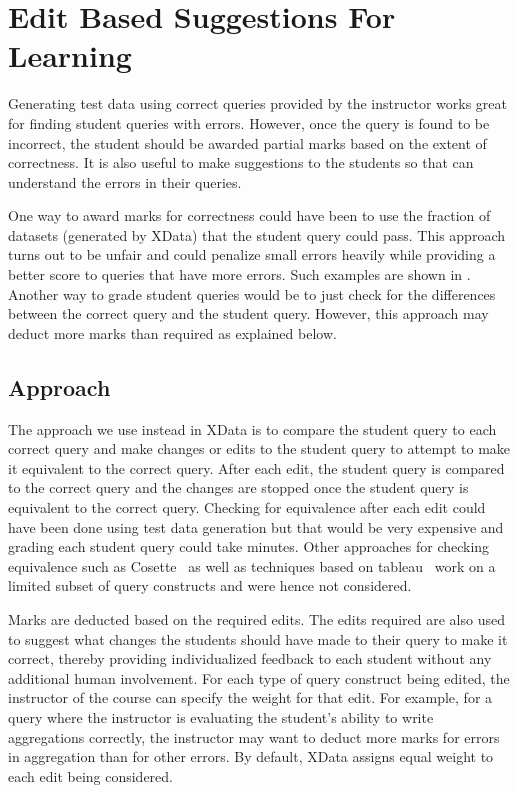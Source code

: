 \section{Edit Based Suggestions For Learning}
\label{sec:edit}
Generating test data using correct queries provided by the instructor works great for finding student queries with errors. However, once the query is found to be incorrect, the student should be awarded partial marks based on the extent of correctness. It is also useful to make suggestions to the students so that can understand the errors in their queries. 

One way to award marks for correctness could have been to use the fraction of datasets (generated by XData) that the student query could pass. This approach turns out to be unfair and could penalize small errors heavily while providing a better score to queries that have more errors. Such examples are shown in \cite{xdata:comad}. Another way to grade student queries would be to just check for the differences between the correct query and the student query. However, this approach may deduct more marks than required as explained below.

\subsection{Approach}


The approach we use instead in XData is to compare the student query to each correct query and make changes or edits to the student query to attempt to make it equivalent to the correct query. After each edit, the student query is compared to the correct query  and the changes are stopped once the student query is equivalent to the correct query. 
Checking for equivalence after each edit could have been done using test data generation but that would be very expensive and grading each student query could take minutes. Other approaches for checking equivalence such as Cosette~\cite{cosette} as well as techniques based on tableau~\cite{tableaux1} work on a limited subset of query constructs and were hence not considered.

Marks are deducted based on the required edits. The edits required are also used to suggest what changes the students should have made to their query to make it correct, thereby providing individualized feedback to each student without any additional human involvement. For each type of query construct being edited, the instructor of the course can specify the weight for that edit. For example, for a query where the instructor is evaluating the student's ability to write aggregations correctly, the instructor may want to deduct more marks for errors in aggregation than for other errors. By default, XData assigns equal weight to each edit being considered.


